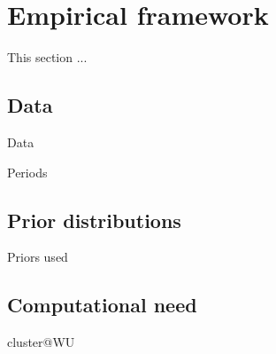 \section{Empirical framework}

This section ...

\subsection{Data}

Data

Periods

\subsection{Prior distributions}

Priors used

\subsection{Computational need}

cluster@WU